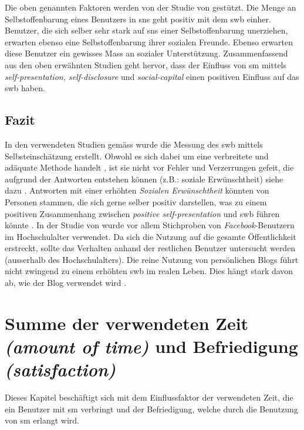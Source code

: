 Die oben genannten Faktoren werden von der Studie von  gestützt. Die Menge an Selbstoffenbarung eines Benutzers in \gls{sns} geht positiv mit dem \gls{swb} einher. Benutzer, die sich selber sehr stark auf \gls{sns} einer Selbstoffenbarung unerziehen, erwarten ebenso eine Selbstoffenbarung ihrer sozialen Freunde. Ebenso erwarten diese Benutzer ein gewisses Mass an sozialer Unterstützung.\newline
Zusammenfassend aus den oben erwähnten Studien geht hervor, dass der Einfluss von \gls{sm} mittels \textit{self-presentation, self-disclosure} und \textit{social-capital} einen positiven Einfluss auf das \gls{swb} haben.

\subsection{Fazit}\label{subsec.selfpFazit}
In den verwendeten Studien gemäss  wurde die Messung des \gls{swb} mittels Selbsteinschätzung erstellt. Obwohl es sich dabei um eine verbreitete und adäquate Methode handelt \cite{Diener:2005}, ist sie nicht vor Fehler und Verzerrungen gefeit, die aufgrund der Antworten entstehen können (z.B.: soziale Erwünschtheit) siehe dazu . Antworten mit einer erhöhten \textit{Sozialen Erwünschtheit} könnten von Personen stammen, die sich gerne selber positiv darstellen, was zu einem positiven Zusammenhang zwischen \textit{positive self-presentation} und \gls{swb} führen könnte \cite{Diener:1991}.\newline
In der Studie von  wurde vor allem Stichproben von \textit{Facebook}-Benutzern im Hochschulalter verwendet. Da sich die Nutzung auf die gesamte Öffentlichkeit erstreckt, sollte das Verhalten anhand der restlichen Benutzer untersucht werden (ausserhalb des Hochschulalters).\newline
Die reine Nutzung von persönlichen Blogs führt nicht zwingend zu einem erhöhten \gls{swb} im realen Leben. Dies hängt stark davon ab, wie der Blog verwendet wird \cite{Jung:2012}.

\section{Summe der verwendeten Zeit \textit{(amount of time)} und Befriedigung \textit{(satisfaction)}}\label{sub.amount}
Dieses Kapitel beschäftigt sich mit dem Einflussfaktor der verwendeten Zeit, die ein Benutzer mit \gls{sm} verbringt und der Befriedigung, welche durch die Benutzung von \gls{sm} erlangt wird. 

